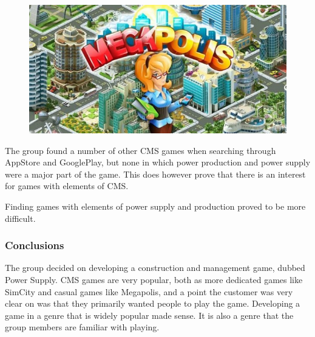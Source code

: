 \begin{figure}[H]
	\centering
	\includegraphics[width=\textwidth]{pictures/megapolis.jpg}
\end{figure}

The group found a number of other CMS games when searching through AppStore and
GooglePlay, but none in which power production and power supply were a major
part of the game. This does however prove that there is an interest for games
with elements of CMS.

Finding games with elements of power supply and production proved to be more
difficult.

\subsubsection{Conclusions}

The group decided on developing a construction and management game, dubbed Power Supply. CMS games are very popular, both as more dedicated games like SimCity and casual games like Megapolis, and a point the customer was very clear on was that they primarily wanted people to play the game. Developing a game in a genre that is widely popular made sense. It is also a genre that the group members are familiar with playing.
